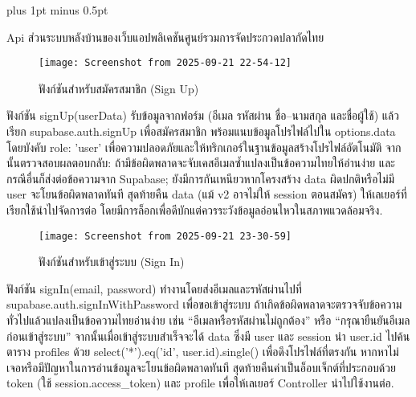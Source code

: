 
\clearpage
\thispagestyle{empty}

\begingroup
\fontsize{16pt}{19.2pt}\selectfont
\justifying
\XeTeXlinebreakskip=0pt plus 1pt minus 0.5pt
\setlength{\parindent}{1.5cm}
\setlength{\parskip}{0pt}

\par

\par

\indent Api ส่วนระบบหลังบ้านของเว็บแอปพลิเคชันศูนย์รวมการจัดประกวดปลากัดไทย

\vspace{\baselineskip}

\begin{figure}[h]
	\centering
	\texttt{[image: Screenshot from 2025-09-21 22-54-12]}
	\caption{ฟังก์ชันสำหรับสมัครสมาชิก (Sign Up)}
\end{figure}

\indent ฟังก์ชัน signUp(userData) รับข้อมูลจากฟอร์ม (อีเมล รหัสผ่าน ชื่อ–นามสกุล และชื่อผู้ใช้) แล้วเรียก supabase.auth.signUp เพื่อสมัครสมาชิก พร้อมแนบข้อมูลโปรไฟล์ไปใน options.data โดยบังคับ role: 'user' เพื่อความปลอดภัยและให้ทริกเกอร์ในฐานข้อมูลสร้างโปรไฟล์อัตโนมัติ จากนั้นตรวจสอบผลตอบกลับ: ถ้ามีข้อผิดพลาดจะจับเคสอีเมลซ้ำแปลงเป็นข้อความไทยให้อ่านง่าย และกรณีอื่นก็ส่งต่อข้อความจาก Supabase; ยังมีการกันเหนียวหากโครงสร้าง data ผิดปกติหรือไม่มี user จะโยนข้อผิดพลาดทันที สุดท้ายคืน data (แม้ v2 อาจไม่ให้ session ตอนสมัคร) ให้เลเยอร์ที่เรียกใช้นำไปจัดการต่อ โดยมีการล็อกเพื่อดีบักแต่ควรระวังข้อมูลอ่อนไหวในสภาพแวดล้อมจริง.

\newpage

\begin{figure}[h]
	\centering
	\texttt{[image: Screenshot from 2025-09-21 23-30-59]}
	\caption{ฟังก์ชันสำหรับเข้าสู่ระบบ (Sign In)}
\end{figure}

\indent ฟังก์ชัน signIn(email, password) ทำงานโดยส่งอีเมลและรหัสผ่านไปที่ supabase.auth.signInWithPassword เพื่อขอเข้าสู่ระบบ ถ้าเกิดข้อผิดพลาดจะตรวจจับข้อความทั่วไปแล้วแปลงเป็นข้อความไทยอ่านง่าย เช่น “อีเมลหรือรหัสผ่านไม่ถูกต้อง” หรือ “กรุณายืนยันอีเมลก่อนเข้าสู่ระบบ” จากนั้นเมื่อเข้าสู่ระบบสำเร็จจะได้ data ซึ่งมี user และ session นำ user.id ไปค้นตาราง profiles ด้วย select('*').eq('id', user.id).single() เพื่อดึงโปรไฟล์ที่ตรงกัน หากหาไม่เจอหรือมีปัญหาในการอ่านข้อมูลจะโยนข้อผิดพลาดทันที สุดท้ายคืนค่าเป็นอ็อบเจ็กต์ที่ประกอบด้วย token (ใช้ session.access\_token) และ profile เพื่อให้เลเยอร์ Controller นำไปใช้งานต่อ.


